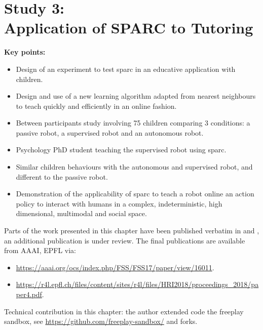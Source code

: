 \chapter[Study 3: Application of SPARC to Tutoring]{Study 3: \\Application of SPARC to Tutoring}\label{chap:tutoring}
\glsresetall
\graphicspath{{images/tutoring/}}

\begin{framed}
	\textbf{Key points:}
	
	\begin{itemize}
		\item Design of an experiment to test \acrshort{sparc} in an educative application with children.
		\item Design and use of a new learning algorithm adapted from nearest neighbours to teach quickly and efficiently in an online fashion.
		\item Between participants study involving 75 children comparing 3 conditions: a passive robot, a supervised robot and an autonomous robot.
		\item Psychology PhD student teaching the supervised robot using \acrshort{sparc}.
		\item Similar children behaviours with the autonomous and supervised robot, and different to the passive robot.
		\item Demonstration of the applicability of \acrshort{sparc} to teach a robot online an action policy to interact with humans in a complex, indeterministic, high dimensional, multimodal and social space.
	\end{itemize}
\end{framed}

Parts of the work presented in this chapter have been published verbatim in \cite{senft2017toward} and \cite{senft2018robots}, an additional publication is under review. The final publications are available from AAAI, EPFL via:
\begin{itemize}
	\item \url{https://aaai.org/ocs/index.php/FSS/FSS17/paper/view/16011}.
	\item \url{https://r4l.epfl.ch/files/content/sites/r4l/files/HRI2018/proceedings_2018/paper4.pdf}.
\end{itemize} 

Technical contribution in this chapter: the author extended code the freeplay sandbox, see \url{https://github.com/freeplay-sandbox/} and forks.

